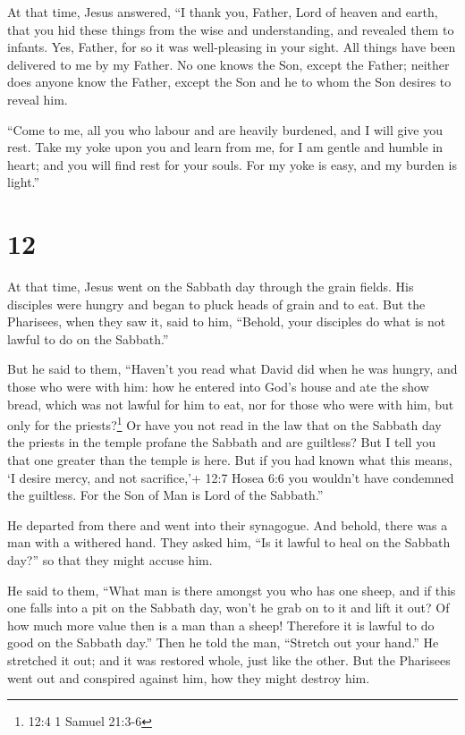  At that time, Jesus answered, ``I thank you, Father, Lord
of heaven and earth, that you hid these things from the wise and
understanding, and revealed them to infants.  Yes, Father,
for so it was well-pleasing in your sight.  All things have
been delivered to me by my Father. No one knows the Son, except the
Father; neither does anyone know the Father, except the Son and he to
whom the Son desires to reveal him.

 ``Come to me, all you who labour and are heavily burdened,
and I will give you rest.  Take my yoke upon you and learn
from me, for I am gentle and humble in heart; and you will find rest for
your souls.  For my yoke is easy, and my burden is light.''

\hypertarget{section-11}{%
\section{12}\label{section-11}}

 At that time, Jesus went on the Sabbath day through the
grain fields. His disciples were hungry and began to pluck heads of
grain and to eat.  But the Pharisees, when they saw it, said
to him, ``Behold, your disciples do what is not lawful to do on the
Sabbath.''

 But he said to them, ``Haven't you read what David did when
he was hungry, and those who were with him:  how he entered
into God's house and ate the show bread, which was not lawful for him to
eat, nor for those who were with him, but only for the
priests?\footnote{12:4 1 Samuel 21:3-6}  Or have you not
read in the law that on the Sabbath day the priests in the temple
profane the Sabbath and are guiltless?  But I tell you that
one greater than the temple is here.  But if you had known
what this means, `I desire mercy, and not sacrifice,'+ 12:7 Hosea 6:6
you wouldn't have condemned the guiltless.  For the Son of
Man is Lord of the Sabbath.''

 He departed from there and went into their synagogue.
 And behold, there was a man with a withered hand. They
asked him, ``Is it lawful to heal on the Sabbath day?'' so that they
might accuse him.

 He said to them, ``What man is there amongst you who has
one sheep, and if this one falls into a pit on the Sabbath day, won't he
grab on to it and lift it out?  Of how much more value then
is a man than a sheep! Therefore it is lawful to do good on the Sabbath
day.''  Then he told the man, ``Stretch out your hand.'' He
stretched it out; and it was restored whole, just like the other.
 But the Pharisees went out and conspired against him, how
they might destroy him.

